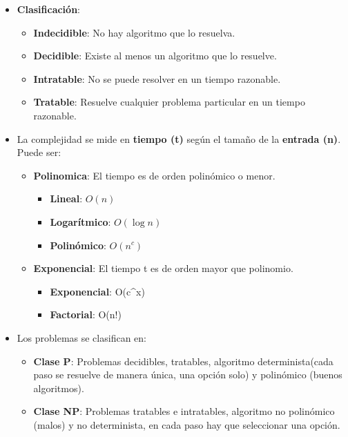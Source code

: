 \documentclass[12pt, twoside, openright]{report} %
\begin{document}
  \begin{itemize}
  \item \textbf{Clasificación}:
    

    \begin{itemize}
    \item \textbf{Indecidible}: No hay algoritmo que lo resuelva.
      
    \item \textbf{Decidible}: Existe al menos un algoritmo que lo resuelve.
      
    \item \textbf{Intratable}: No se puede resolver en un tiempo razonable.
      
    \item \textbf{Tratable}: Resuelve cualquier problema particular en un
      tiempo razonable.
      
    \end{itemize}
  \item La complejidad se mide en \textbf{tiempo (t)} según el tamaño de la
    \textbf{entrada (n)}. Puede ser:
    

    \begin{itemize}
    \item \textbf{Polinomica}: El tiempo es de orden polinómico o menor.
      

      \begin{itemize}
      \item \textbf{Lineal}: $O(n)$
        
      \item \textbf{Logarítmico}: $O(\log n)$
        
      \item \textbf{Polinómico}: $O(n^c)$
        
      \end{itemize}
    \item \textbf{Exponencial}: El tiempo t es de orden mayor que polinomio.
      

      \begin{itemize}
      \item \textbf{Exponencial}: O(c\^{}x)
        
      \item \textbf{Factorial}: O(n!)
        
      \end{itemize}
    \end{itemize}
  \item Los problemas se clasifican en:
    

    \begin{itemize}
    \item \textbf{Clase P}: Problemas decidibles, tratables, algoritmo
      determinista(cada paso se resuelve de manera única, una opción
      solo) y polinómico (buenos algoritmos).
      
    \item \textbf{Clase NP}: Problemas tratables e intratables, algoritmo no
      polinómico (malos) y no determinista, en cada paso hay que seleccionar una opción.
      
    \end{itemize}
  \end{itemize}
\end{document}

